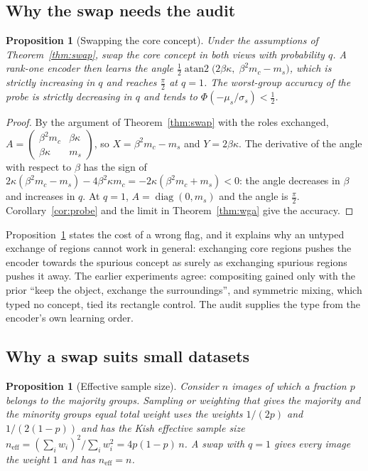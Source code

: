 \documentclass[11pt]{article}
\newtheorem{proposition}[theorem]{Proposition}
\theoremstyle{definition}
\theoremstyle{remark}
\begin{document}
\subsection{Why the swap needs the audit}

\begin{proposition}[Swapping the core concept]\label{prop:wrong}
Under the assumptions of Theorem~\ref{thm:swap}, swap the \emph{core} concept in both views with probability $q$. A
rank-one encoder then learns the angle
$\tfrac12\operatorname{atan2}\big(2\beta\kappa,\;\beta^2m_c-m_s\big)$, which is strictly increasing in $q$ and
reaches $\tfrac\pi2$ at $q=1$. The worst-group accuracy of the probe is strictly decreasing in $q$ and tends to
$\Phi(-\mu_s/\sigma_s)<\tfrac12$.
\end{proposition}

\begin{proof}
By the argument of Theorem~\ref{thm:swap} with the roles exchanged,
$A=\begin{pmatrix}\beta^2m_c&\beta\kappa\\ \beta\kappa&m_s\end{pmatrix}$, so $X=\beta^2m_c-m_s$ and $Y=2\beta\kappa$.
The derivative of the angle with respect to $\beta$ has the sign of
$2\kappa(\beta^2m_c-m_s)-4\beta^2\kappa m_c=-2\kappa(\beta^2m_c+m_s)<0$: the angle decreases in $\beta$ and increases
in $q$. At $q=1$, $A=\operatorname{diag}(0,m_s)$ and the angle is $\tfrac\pi2$. Corollary~\ref{cor:probe} and the
limit in Theorem~\ref{thm:wga} give the accuracy.
\end{proof}

Proposition~\ref{prop:wrong} states the cost of a wrong flag, and it explains why an untyped exchange of regions
cannot work in general: exchanging core regions pushes the encoder towards the spurious concept as surely as
exchanging spurious regions pushes it away. The earlier experiments agree: compositing gained only with the prior
``keep the object, exchange the surroundings'', and symmetric mixing, which typed no concept, tied its rectangle
control. The audit supplies the type from the encoder's own learning order.

\subsection{Why a swap suits small datasets}

\begin{proposition}[Effective sample size]\label{prop:ess}
Consider $n$ images of which a fraction $p$ belongs to the majority groups. Sampling or weighting that gives the
majority and the minority groups equal total weight uses the weights $1/(2p)$ and $1/(2(1-p))$ and has the Kish
effective sample size $n_{\mathrm{eff}}=(\sum_iw_i)^2/\sum_iw_i^2=4p(1-p)\,n$. A swap with $q=1$ gives every image
the weight $1$ and has $n_{\mathrm{eff}}=n$.
\end{proposition}
\end{document}
